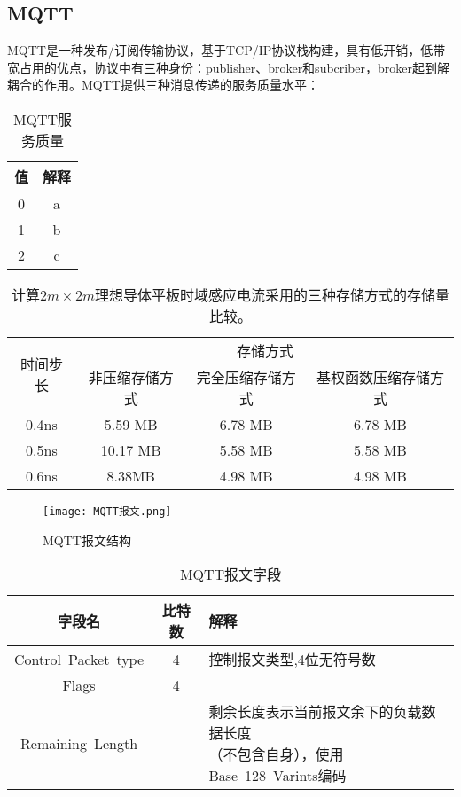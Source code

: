 \subsection{MQTT}

MQTT是一种发布/订阅传输协议，基于TCP/IP协议栈构建，具有低开销，低带宽占用的优点，协议中有三种身份：publisher、broker和subcriber，broker起到解耦合的作用。MQTT提供三种消息传递的服务质量水平：

\begin{table}[h!]
\caption{MQTT服务质量}
\begin{tabular}{cc}
\toprule
值 & 解释 \\
\midrule
0 & a \\
1 & b \\
2 & c \\
\bottomrule
\end{tabular}
\label{tablea}
\end{table}



\begin{table}[h]
\caption{计算$2m\times 2m$理想导体平板时域感应电流采用的三种存储方式的存储量比较。}
\begin{tabular}{cccc}
\toprule
\multirow{2}{*}{时间步长} & \multicolumn{3}{c}{存储方式} \\
\cmidrule{2-4}
& 非压缩存储方式 & 完全压缩存储方式 & 基权函数压缩存储方式 \\
\midrule
0.4ns & 5.59 MB & 6.78 MB & 6.78 MB\\
0.5ns & 10.17 MB & 5.58 MB & 5.58 MB \\
0.6ns & 8.38MB & 4.98 MB & 4.98 MB \\
\bottomrule
\end{tabular}
\label{tablea}
\end{table}

\begin{figure}[h]
	\texttt{[image: MQTT报文.png]}
	\caption{MQTT报文结构}
	\label{MQTT报文}
\end{figure}

\begin{table}[h!]
\caption{MQTT报文字段}
\begin{tabular}{ccl}
\toprule
字段名 & 比特数 & 解释\\
\midrule
Control Packet type	&4&控制报文类型,4位无符号数\\
Flags	&4&	\\
Remaining Length&&\makecell[c]{剩余长度表示当前报文余下的负载数据长度\\（不包含自身），使用Base 128 Varints编码}\\
\bottomrule
\end{tabular}
\label{mqtt字段}
\end{table}

